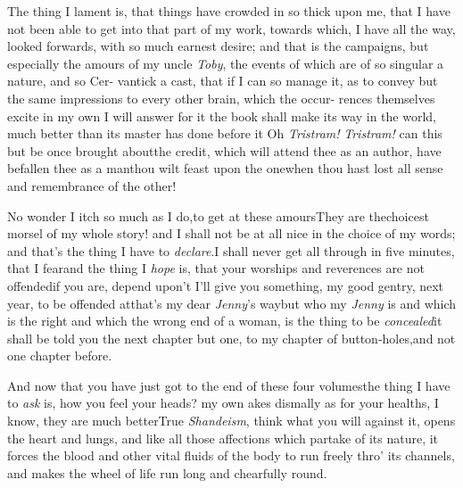 \documentclass{article}
\begin{document}
The thing I lament is, that things\break
have crowded in so thick upon me,\break
that I have not been able to get into\break
that part of my work, towards which,\break
I have all the way, looked forwards,\break
with so much earnest desire; and that is\break
the campaigns, but especially the amours\break
of my uncle \textit{Toby}, the events of which\break
are of so singular a nature, and so Cer-\break
vantick a cast, that if I can so manage\break
it, as to convey but the same impressions\break
to every other brain, which the occur-\break
rences themselves excite in my own\tsh\break
I will answer for it the book shall make\break
its way in the world, much better\break
than its master has done before it\tsh\break
Oh \textit{Tristram!} \textit{Tristram!} can this but\break
be once brought about\tsh the credit,
which will attend thee as an author,\break
{}\break
have befallen thee as a man\tsk thou wilt\break
feast upon the one\tsh when thou hast\break
lost all sense and remembrance of the\break 
other!\tsh

No wonder I itch so much as I do,\break to get at these
amours\tsk They are the\break choicest morsel of my whole story! and
\break
I shall not be at all nice in the choice of my words;\tsh
and that’s the thing I have to \textit{declare}.\tsk I shall
never get all through in five minutes, that I fear\tsh and
the thing I \textit{hope} is, that your worships and
reverences are not offended\tsk if you are, depend upon’t
I’ll give you something, my good gentry, next year, to be
offended at\tsh that’s my dear \textit{Jenny}’s way\tsk but
who my \textit{Jenny} is\tsk\break
and which is the right and which the wrong end of a woman, is the thing to be
\textit{concealed}\tsk it shall be told you the next
chapter but one, to my chapter of button-holes,\tsk and not
one chapter before.


And now that you have just got to\break
the end of these four volumes\tsk\tsk the\break
thing I have to \textit{ask} is, how you feel\break
your heads? my own akes dismally\tsk\break
as for your healths, I know, they are\break
much better\tsh True \textit{Shandeism}, think\break
what you will against it, opens the\break
heart and lungs, and like all those affections which
partake of its nature, it forces the blood and other vital
fluids of the body to run freely thro’ its channels, and makes
the wheel of life run long and chearfully round.
\end{document}
